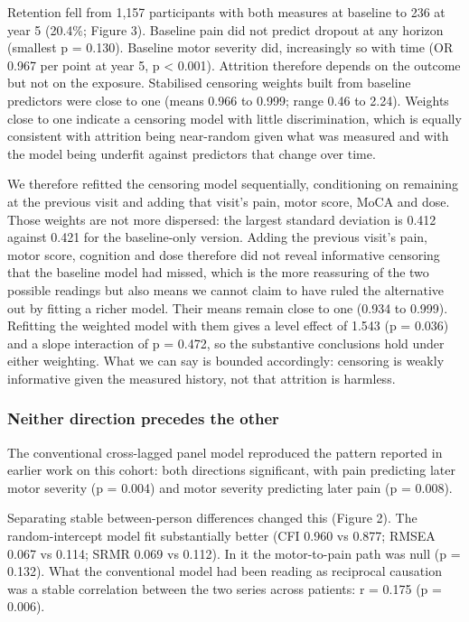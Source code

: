 \documentclass[
  english,
  12pt,
]{article}
\begin{document}
Retention fell from 1,157 participants with both measures at baseline to 236 at year 5 (20.4\%; Figure 3). Baseline pain did not predict dropout at any horizon (smallest p = 0.130). Baseline motor severity did, increasingly so with time (OR 0.967 per point at year 5, p \textless{} 0.001). Attrition therefore depends on the outcome but not on the exposure. Stabilised censoring weights built from baseline predictors were close to one (means 0.966 to 0.999; range 0.46 to 2.24). Weights close to one indicate a censoring model with little discrimination, which is equally consistent with attrition being near-random given what was measured and with the model being underfit against predictors that change over time.

We therefore refitted the censoring model sequentially, conditioning on remaining at the previous visit and adding that visit's pain, motor score, MoCA and dose. Those weights are not more dispersed: the largest standard deviation is 0.412 against 0.421 for the baseline-only version. Adding the previous visit's pain, motor score, cognition and dose therefore did not reveal informative censoring that the baseline model had missed, which is the more reassuring of the two possible readings but also means we cannot claim to have ruled the alternative out by fitting a richer model. Their means remain close to one (0.934 to 0.999). Refitting the weighted model with them gives a level effect of 1.543 (p = 0.036) and a slope interaction of p = 0.472, so the substantive conclusions hold under either weighting. What we can say is bounded accordingly: censoring is weakly informative given the measured history, not that attrition is harmless.

\subsubsection{Neither direction precedes the other}\label{neither-direction-precedes-the-other}

The conventional cross-lagged panel model reproduced the pattern reported in earlier work on this cohort: both directions significant, with pain predicting later motor severity (p = 0.004) and motor severity predicting later pain (p = 0.008).

Separating stable between-person differences changed this (Figure 2). The random-intercept model fit substantially better (CFI 0.960 vs 0.877; RMSEA 0.067 vs 0.114; SRMR 0.069 vs 0.112). In it the motor-to-pain path was null (p = 0.132). What the conventional model had been reading as reciprocal causation was a stable correlation between the two series across patients: r = 0.175 (p = 0.006).
\end{document}

